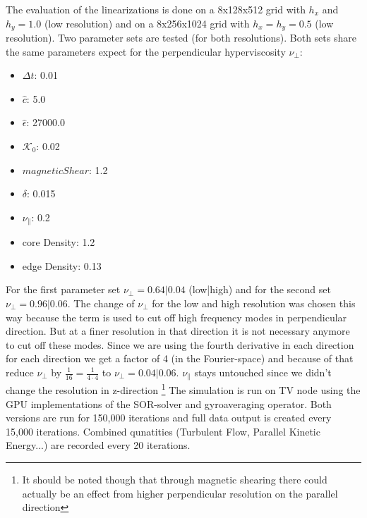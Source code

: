 \documentclass[master.tex]{subfiles}
\begin{document}
The evaluation of the linearizations is done on a 8x128x512 grid with $h_x$ and $h_y=1.0$ (low resolution) and on a 8x256x1024 grid with $h_x = h_y=0.5$ (low resolution). Two parameter sets are tested (for both resolutions). Both sets share the same parameters expect for the perpendicular hyperviscosity $\nu_\perp$:
\begin{itemize}
    \item $\Delta t$: 0.01
    \item $\hat{c}$: 5.0
    \item $\hat{\epsilon}$: 27000.0
    \item $\mathcal{K}_0$: 0.02
    \item $magnetic Shear$: 1.2
    \item $\delta$: 0.015
    \item $\nu_{\parallel}$: 0.2
    \item core Density: 1.2
    \item edge Density: 0.13
\end{itemize}
For the first parameter set $\nu_{\perp} = 0.64|0.04$ (low|high) and for the second set $\nu_{\perp} = 0.96|0.06$. The change of $\nu_\perp$ for the low and high resolution was chosen this way because the term is used to cut off high frequency modes in perpendicular direction. But at a finer resolution in that direction it is not necessary anymore to cut off these modes. Since we are using the fourth derivative in each direction for each direction we get a factor of 4 (in the Fourier-space) and because of that reduce $\nu_\perp$ by $\frac{1}{16} = \frac{1}{4\cdot4}$ to $\nu_\perp = 0.04|0.06$. $\nu_\parallel$ stays untouched since we didn't change the resolution in z-direction \footnote{It should be noted though that through magnetic shearing there could actually be an effect from higher perpendicular resolution on the parallel direction} \newline
The simulation is run on \ac{TV} node using the GPU implementations of the \ac{SOR}-solver and gyroaveraging operator. Both versions are run for 150,000 iterations and full data output is created every 15,000 iterations. Combined qunatities (Turbulent Flow, Parallel Kinetic Energy...) are recorded every 20 iterations.
\end{document}
